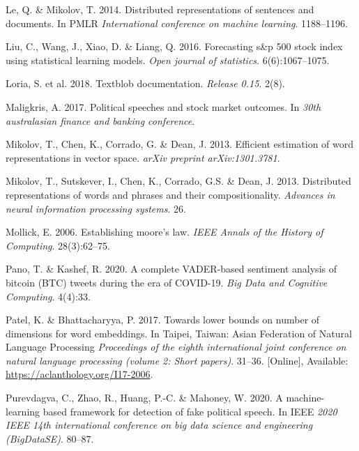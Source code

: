 \documentclass[11pt,preprint, authoryear]{elsarticle}
\numberwithin{equation}{section}
\numberwithin{figure}{section}
\numberwithin{table}{section}
\newlength{\cslhangindent}
\newenvironment{CSLReferences}%
  {\setlength{\parindent}{0pt}%
  \everypar{\setlength{\hangindent}{\cslhangindent}}\ignorespaces}%
  {\par}
\begin{document}
\begin{CSLReferences}{1}{0}
\leavevmode{}%
Le, Q. \& Mikolov, T. 2014. Distributed representations of sentences and
documents. In PMLR \emph{International conference on machine learning}.
1188--1196.

\leavevmode{}%
Liu, C., Wang, J., Xiao, D. \& Liang, Q. 2016. Forecasting s\&p 500
stock index using statistical learning models. \emph{Open journal of
statistics}. 6(6):1067--1075.

\leavevmode{}%
Loria, S. et al. 2018. Textblob documentation. \emph{Release 0.15}.
2(8).

\leavevmode{}%
Maligkris, A. 2017. Political speeches and stock market outcomes. In
\emph{30th australasian finance and banking conference}.

\leavevmode{}%
Mikolov, T., Chen, K., Corrado, G. \& Dean, J. 2013. Efficient
estimation of word representations in vector space. \emph{arXiv preprint
arXiv:1301.3781}.

\leavevmode{}%
Mikolov, T., Sutskever, I., Chen, K., Corrado, G.S. \& Dean, J. 2013.
Distributed representations of words and phrases and their
compositionality. \emph{Advances in neural information processing
systems}. 26.

\leavevmode{}%
Mollick, E. 2006. Establishing moore's law. \emph{IEEE Annals of the
History of Computing}. 28(3):62--75.

\leavevmode{}%
Pano, T. \& Kashef, R. 2020. A complete VADER-based sentiment analysis
of bitcoin (BTC) tweets during the era of COVID-19. \emph{Big Data and
Cognitive Computing}. 4(4):33.

\leavevmode{}%
Patel, K. \& Bhattacharyya, P. 2017. Towards lower bounds on number of
dimensions for word embeddings. In Taipei, Taiwan: Asian Federation of
Natural Language Processing \emph{Proceedings of the eighth
international joint conference on natural language processing (volume 2:
Short papers)}. 31--36. {[}Online{]}, Available:
\url{https://aclanthology.org/I17-2006}.

\leavevmode{}%
Purevdagva, C., Zhao, R., Huang, P.-C. \& Mahoney, W. 2020. A
machine-learning based framework for detection of fake political speech.
In IEEE \emph{2020 IEEE 14th international conference on big data
science and engineering (BigDataSE)}. 80--87.


\end{CSLReferences}
\end{document}
